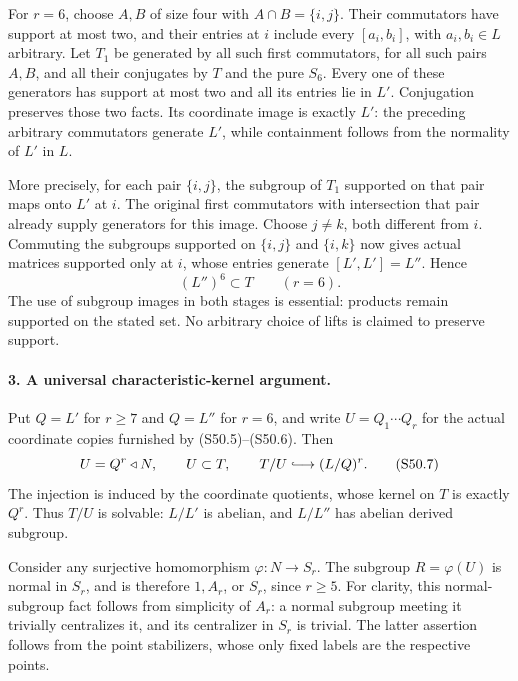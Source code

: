 For \(r=6\), choose \(A,B\) of size four with
\(A\cap B=\{i,j\}\). Their commutators have support at
most two, and their entries at \(i\) include every
\([a_i,b_i]\), with \(a_i,b_i\in L\) arbitrary.
Let \(T_1\) be generated by all such first commutators,
for all such pairs \(A,B\), and all their conjugates by
\(T\) and the pure \(S_6\). Every one of these generators
has support at most two and all its entries lie in \(L'\).
Conjugation preserves those two facts. Its coordinate image
is exactly \(L'\): the preceding arbitrary commutators
generate \(L'\), while containment follows from the
normality of \(L'\) in \(L\).

More precisely, for each pair \(\{i,j\}\), the subgroup
of \(T_1\) supported on that pair maps onto \(L'\) at
\(i\). The original first commutators with intersection
that pair already supply generators for this image. Choose
\(j\ne k\), both different from \(i\). Commuting the
subgroups supported on \(\{i,j\}\) and \(\{i,k\}\)
now gives actual matrices supported only at \(i\), whose
entries generate \([L',L']=L''\). Hence
\[
                          (L'')^6\subset T\qquad(r=6).
                                                               \tag{S50.6}
\]
The use of subgroup images in both stages is essential:
products remain supported on the stated set. No arbitrary
choice of lifts is claimed to preserve support.

\paragraph{3. A universal characteristic-kernel argument.}
Put \(Q=L'\) for \(r\ge7\) and \(Q=L''\) for
\(r=6\), and write \(U=Q_1\cdots Q_r\) for the actual
coordinate copies furnished by (S50.5)--(S50.6). Then
\[
 U=Q^r\triangleleft N,\qquad U\subset T,
 \qquad T/U\lhook\joinrel\longrightarrow (L/Q)^r.
                                                               \tag{S50.7}
\]
The injection is induced by the coordinate quotients, whose
kernel on \(T\) is exactly \(Q^r\). Thus \(T/U\)
is solvable: \(L/L'\) is abelian, and \(L/L''\) has
abelian derived subgroup.

Consider any surjective homomorphism
\(\varphi:N\to S_r\). The subgroup
\(R=\varphi(U)\) is normal in \(S_r\), and is therefore
\(1,A_r\), or \(S_r\), since \(r\ge5\).
For clarity, this normal-subgroup fact follows from simplicity
of \(A_r\): a normal subgroup meeting it trivially
centralizes it, and its centralizer in \(S_r\) is trivial.
The latter assertion follows from the point stabilizers, whose
only fixed labels are the respective points.

